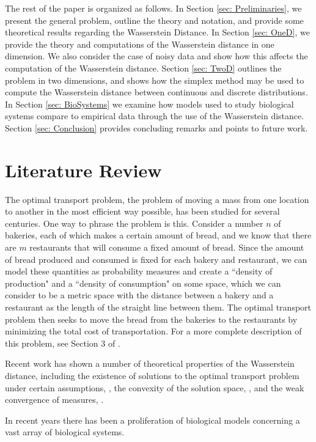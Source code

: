 \documentclass[10pt]{article}
\begin{document}
The rest of the paper is organized as follows. In Section \ref{sec: Preliminaries}, we present the general problem, outline the theory and notation, and provide some theoretical results regarding the Wasserstein Distance. In Section \ref{sec: OneD}, we provide the theory and computations of the Wasserstein distance in one dimension. We also consider the case of noisy data and show how this affects the computation of the Wasserstein distance. Section \ref{sec: TwoD} outlines the problem in two dimensions, and shows how the simplex method may be used to compute the Wasserstein distance between continuous and discrete distributions. In Section \ref{sec: BioSystems} we examine how models used to study biological systems compare to empirical data through the use of the Wasserstein distance. Section \ref{sec: Conclusion} provides concluding remarks and points to future work.


\section{Literature Review} 
The optimal transport problem, the problem of moving a mass from one location to another in the most efficient way possible, has been studied for several centuries. One way to phrase the problem is this. Consider a number $n$ of bakeries, each of which makes a certain amount of bread, and we know that there are $m$ restaurants that will consume a fixed amount of bread. Since the amount of bread produced and consumed is fixed for each bakery and restaurant, we can model these quantities as probability measures and create a ``density of production" and a ``density of consumption" on some space, which we can consider to be a metric space with the distance between a bakery and a restaurant as the length of the straight line between them. The optimal transport problem then seeks to move the bread from the bakeries to the restaurants by minimizing the total cost of transportation. For a more complete description of this problem, see Section 3 of \cite{CVillani}.

\noindent Recent work has shown a number of theoretical properties of the Wasserstein distance, including the existence of solutions to the optimal transport problem under certain assumptions, \cite{CVillani}, the convexity of the solution space, \cite{AN}, and the weak convergence of measures, \cite{AN}. 

\noindent In recent years there has been a proliferation of biological models concerning a vast array of biological systems. 
\end{document}
